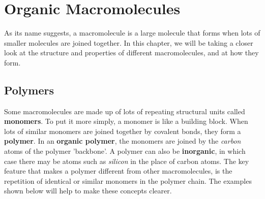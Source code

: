 \chapter{Organic Macromolecules}
\label{chap:orgmac}

As its name suggests, a macromolecule is a large molecule that forms when lots of smaller molecules are joined together. In this chapter, we will be taking a closer look at the structure and properties of different macromolecules, and at how they form. 



\section{Polymers}
\label{sec:orgmac:polymers}

Some macromolecules are made up of lots of repeating structural units called \textbf{monomers}. To put it more simply, a monomer is like a building block. When lots of similar monomers are joined together by covalent bonds, they form a \textbf{polymer}. In an \textbf{organic polymer}, the monomers are joined by the \textit{carbon} atoms of the polymer 'backbone'. A polymer can also be \textbf{inorganic}, in which case there may be atoms such as \textit{silicon} in the place of carbon atoms. The key feature that makes a polymer different from other macromolecules, is the repetition of identical or similar monomers in the polymer chain. The examples shown below will help to make these concepts clearer. 



